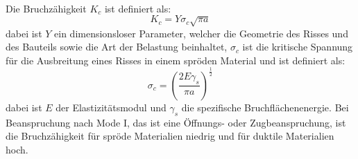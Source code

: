 \documentclass[11pt,a4paper]{article}
\numberwithin{equation}{section}
\numberwithin{figure}{section}
\begin{document}
\\
\begin{addmargin}[25pt]{0pt}
Die Bruchzähigkeit $K_c$ ist definiert als:
\begin{equation}\label{eq:definition_Bruchzähigkeit}
    K_c = Y\sigma_c \sqrt{\pi a}
\end{equation}
dabei ist $Y$ ein dimensionsloser Parameter, welcher die Geometrie des Risses und des Bauteils sowie die Art der Belastung beinhaltet, $\sigma_c$ ist die kritische Spannung für die Ausbreitung eines Risses in einem spröden Material und ist definiert als:
\begin{equation}\label{eq:definition_kritische_Spannung_sprödes_Material}
    \sigma_c = \left( \frac{2E\gamma_s}{\pi a}\right)^\frac{1}{2}
\end{equation}
dabei ist $E$ der Elastizitätsmodul und $\gamma_s$ die spezifische Bruchflächenenergie. Bei Beanspruchung nach Mode I, das ist eine Öffnungs- oder Zugbeanspruchung, ist die Bruchzähigkeit für spröde Materialien niedrig und für duktile Materialien hoch.\\
\end{addmargin}
\end{document}
